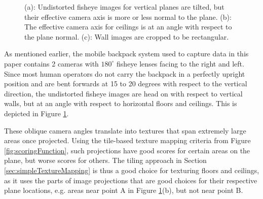 \documentclass[10pt,twocolumn,letterpaper]{article}
\begin{document}
\begin{figure}
  \centering
  \centering
  \centering
  \caption{(a): Undistorted fisheye images for vertical planes are
    tilted, but their effective camera axis is more or less normal to
    the plane. (b): The effective camera axis for ceilings is at an
    angle with respect to the plane normal. (c): Wall images are
    cropped to be rectangular.}
  \label{fig:projectionAngles}
\end{figure}



As mentioned earlier, the mobile backpack system used to capture data
in this paper contains 2 cameras with $180^\circ$ fisheye lenses
facing to the right and left. Since most human operators do not carry
the backpack in a perfectly upright position and are bent forwards at
15 to 20 degrees with respect to the vertical direction, the
undistorted fisheye images are head on with respect to vertical walls,
but at an angle with respect to horizontal floors and ceilings. This
is depicted in Figure \ref{fig:projectionAngles}.


These oblique camera angles translate into textures that span
extremely large areas once projected. Using the tile-based texture
mapping criteria from Figure \ref{fig:scoringFunction}, such
projections have good scores for certain areas on the plane, but worse
scores for others. The tiling approach in Section
\ref{sec:simpleTextureMapping} is thus a good choice for texturing
floors and ceilings, as it uses the parts of image projections that
are good choices for their respective plane locations, e.g. areas near
point A in Figure \ref{fig:projectionAngles}(b), but not near point B.
\end{document}
